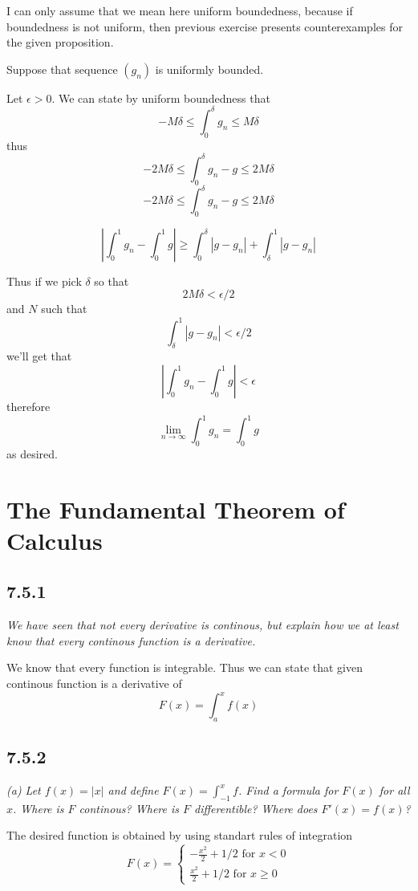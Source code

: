 \documentclass[11pt,oneside,titlepage]{book}
\begin{document}
I can only assume that we mean here uniform boundedness, because if
boundedness is not uniform, then previous exercise presents counterexamples
for the given proposition.

Suppose that sequence $(g_n)$ is uniformly bounded.

Let $\epsilon > 0$. We can state by uniform boundedness that
$$-M \delta \leq \int_0^\delta g_n \leq M \delta$$
thus
$$-2M \delta \leq \int_0^\delta g_n - g \leq 2M \delta$$
$$-2M \delta \leq \int_0^\delta g_n - g \leq 2M \delta$$

$$\left|\int_0^1{g_n} - \int_0^1{g}\right| \geq \int_0^{\delta}{|g - g_n|}
+ \int_{\delta}^1{|g - g_n|} $$

Thus if we pick $\delta$ so that
$$2M \delta < \epsilon/2 $$
and $N$ such that
$$\int_{\delta}^1{|g - g_n|} < \epsilon/2$$
we'll get that
$$\left|\int_0^1{g_n} - \int_0^1{g}\right| < \epsilon$$
therefore 
$$\lim_{n \to \infty}{\int_0^1 g_n} = \int_0^1 g$$
as desired.

\section{The Fundamental Theorem of Calculus}

\subsection*{7.5.1}
\textit{We have seen that not every derivative is continous, but explain how
  we at least know that every continous function is a derivative.}

We know that every function is integrable. Thus we can state that
given continous function is a derivative of
$$F(x) = \int_a^x{f(x)}$$


\subsection*{7.5.2}

\textit{(a) Let $f(x) = |x|$ and define $F(x) = \int_{-1}^x{f}$. Find a
  formula for $F(x)$ for all $x$. Where is $F$ continous? Where is $F$
  differentible? Where does $F'(x) = f(x)$? }

The desired function is obtained by using standart rules of integration
$$F(x) =
\begin{cases}
  -\frac{x^2}{2} + 1/2  \text{ for } x < 0 \\
  \frac{x^2}{2} + 1/2\text{ for } x \geq 0
\end{cases}
$$
\end{document}
